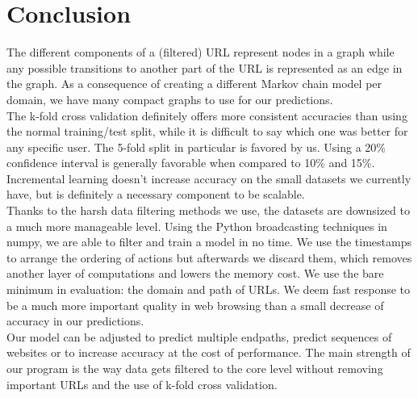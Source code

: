 \section{Conclusion}\label{sec:conclusion}

The different components of a (filtered) URL represent nodes in a graph while any possible transitions to another part of the URL is represented as an edge in the graph. As a consequence of creating a different Markov chain model per domain, we have many compact graphs to use for our predictions.
\\[2ex]
The k-fold cross validation definitely offers more consistent accuracies than using the normal training/test split, while it is difficult to say which one was better for any specific user. The 5-fold split in particular is favored by us. Using a 20\% confidence interval is generally favorable when compared to 10\% and 15\%. Incremental learning doesn't increase accuracy on the small datasets we currently have, but is definitely a necessary component to be scalable.
\\[2ex]
Thanks to the harsh data filtering methods we use, the datasets are downsized to a much more manageable level. Using the Python broadcasting techniques in numpy, we are able to filter and train a model in no time. We use the timestamps to arrange the ordering of actions but afterwards we discard them, which removes another layer of computations and lowers the memory cost. We use the bare minimum in evaluation: the domain and path of URLs. We deem fast response to be a much more important quality in web browsing than a small decrease of accuracy in our predictions.
\\[2ex]
Our model can be adjusted to predict multiple endpaths, predict sequences of websites or to increase accuracy at the cost of performance. The main strength of our program is the way data gets filtered to the core level without removing important URLs and the use of k-fold cross validation.